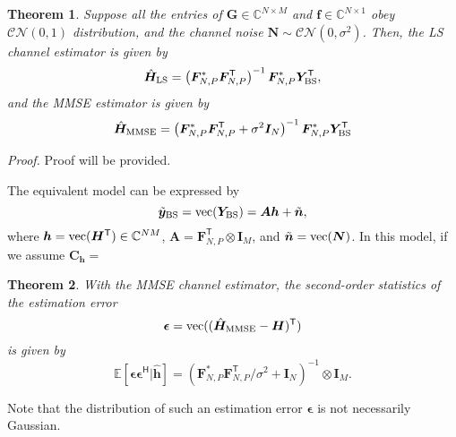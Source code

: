 \documentclass[a4paper,12pt]{article}
\newtheorem{theorem}{\bf Theorem}
\def \T {^{\mathsf{T}}}
\def \H {^{\mathsf{H}}}
\begin{document}


\begin{theorem} 
    Suppose all the entries of ${\bm G}\in\mathbb{C}^{N\times M}$ and ${\bm f}\in\mathbb{C}^{N\times 1}$ obey ${\mathcal{CN}(0,1)}$ distribution, and the channel noise ${\bm N}\sim \mathcal{CN}(0,\sigma^2)$. 
    Then, the LS channel estimator is given by 
    \begin{equation}
        \hat{\bm{H}}_{\rm LS} = \left( {\bm F}_{N,P}^{*} {\bm F_{N,P}\T} \right)^{-1}{\bm F}_{N,P}^{*}{\bm Y}_{\rm BS}\T,
    \end{equation}
    and the MMSE estimator is given by 
    \begin{equation}
        \hat{\bm{H}}_{\rm MMSE} = \left( {\bm F}_{N,P}^{*} {\bm F_{N,P}\T + \sigma^2 {\bm I}_N} \right)^{-1}{\bm F}_{N,P}^{*}{\bm Y}_{\rm BS}\T
    \end{equation}
\end{theorem}

{\it Proof.}
Proof will be provided. 

The equivalent model can be expressed by 
\begin{equation}
    \tilde{\bm y}_{\rm BS} = {\rm vec}({\bm Y}_{\rm BS}) = {\bm A}{\bm h} + \tilde{\bm n},
\end{equation}
where ${\bm h} = {\rm vec}({\bm H}\T)\in\mathbb{C}^{NM}$, ${\bm A} = {\bm F}_{N,P}\T\otimes {\bm I}_M$, and $\tilde{\bm n} = {\rm vec}({\bm N})$. In this model, if we assume ${\bm C}_{\bm h} = $ 

\begin{theorem}
    With the MMSE channel estimator, the second-order statistics of the estimation error 
    \begin{equation}
        {\bm \epsilon} = {\rm vec}((\hat{{\bm H}}_{\rm MMSE} - {\bm H})\T)  
    \end{equation}
    is given by 
    \begin{equation}
        \mathbb{E}[{\bm \epsilon}{\bm \epsilon}\H | \hat{\bm h}] = \left( {\bm F}_{N,P}^{*} {\bm F_{N,P}\T / \sigma^2 + {\bm I}_N} \right)^{-1} \otimes {\bm I}_M.
    \end{equation}
\end{theorem}

Note that the distribution of such an estimation error ${\bm \epsilon}$ is not necessarily Gaussian. 
\end{document}
